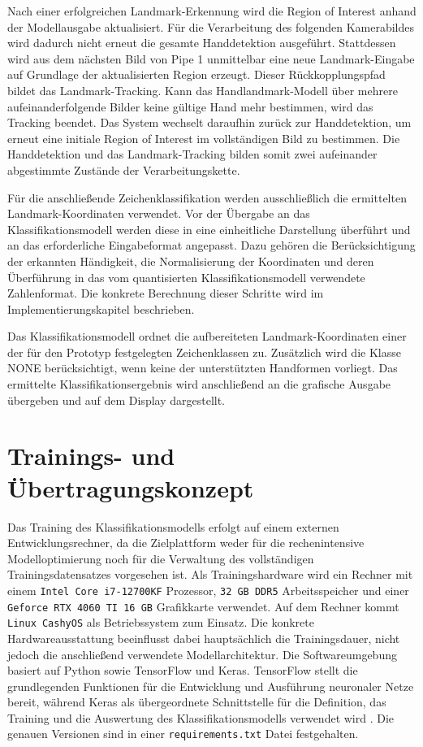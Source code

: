 Nach einer erfolgreichen Landmark-Erkennung wird die Region of Interest anhand der Modellausgabe aktualisiert. Für die Verarbeitung des folgenden Kamerabildes wird dadurch nicht erneut die gesamte Handdetektion ausgeführt. Stattdessen wird aus dem nächsten Bild von Pipe 1 unmittelbar eine neue Landmark-Eingabe auf Grundlage der aktualisierten Region erzeugt. Dieser Rückkopplungspfad bildet das Landmark-Tracking. Kann das Handlandmark-Modell über mehrere aufeinanderfolgende Bilder keine gültige Hand mehr bestimmen, wird das Tracking beendet. Das System wechselt daraufhin zurück zur Handdetektion, um erneut eine initiale Region of Interest im vollständigen Bild zu bestimmen. Die Handdetektion und das Landmark-Tracking bilden somit zwei aufeinander abgestimmte Zustände der Verarbeitungskette.

Für die anschließende Zeichenklassifikation werden ausschließlich die ermittelten Landmark-Koordinaten verwendet. Vor der Übergabe an das Klassifikationsmodell werden diese in eine einheitliche Darstellung überführt und an das erforderliche Eingabeformat angepasst. Dazu gehören die Berücksichtigung der erkannten Händigkeit, die Normalisierung der Koordinaten und deren Überführung in das vom quantisierten Klassifikationsmodell verwendete Zahlenformat. Die konkrete Berechnung dieser Schritte wird im Implementierungskapitel beschrieben.

Das Klassifikationsmodell ordnet die aufbereiteten Landmark-Koordinaten einer der für den Prototyp festgelegten Zeichenklassen zu. Zusätzlich wird die Klasse NONE berücksichtigt, wenn keine der unterstützten Handformen vorliegt. Das ermittelte Klassifikationsergebnis wird anschließend an die grafische Ausgabe übergeben und auf dem Display dargestellt.

\section{Trainings- und Übertragungskonzept}\label{sec:trainingskonzept}

Das Training des Klassifikationsmodells erfolgt auf einem externen Entwicklungsrechner, da die Zielplattform weder für die rechenintensive Modelloptimierung noch für die Verwaltung des vollständigen Trainingsdatensatzes vorgesehen ist. Als Trainingshardware wird ein Rechner mit einem \texttt{Intel Core i7-12700KF} Prozessor, \texttt{32 GB DDR5} Arbeitsspeicher und einer \texttt{Geforce RTX 4060 TI 16 GB} Grafikkarte verwendet. Auf dem Rechner kommt \texttt{Linux \linebreak CashyOS} \cite{CachyOS} als Betriebssystem zum Einsatz. Die konkrete Hardwareausstattung beeinflusst dabei hauptsächlich die Trainingsdauer, nicht jedoch die anschließend verwendete Modellarchitektur. Die Softwareumgebung basiert auf Python sowie TensorFlow und Keras. TensorFlow stellt die grundlegenden Funktionen für die Entwicklung und Ausführung neuronaler Netze bereit, während Keras als übergeordnete Schnittstelle für die Definition, das Training und die Auswertung des Klassifikationsmodells verwendet wird \cite{TensorFlow,Keras}. Die genauen Versionen sind in einer \texttt{requirements.txt} Datei festgehalten.

